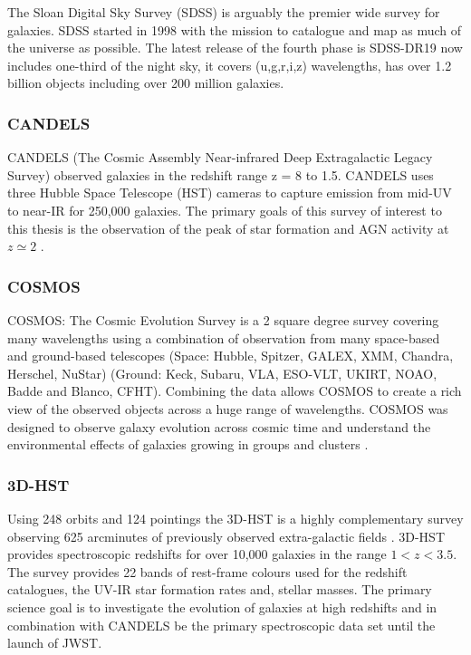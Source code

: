 The Sloan Digital Sky Survey (SDSS) is arguably the premier wide survey for galaxies. SDSS started in 1998 with the mission to catalogue and map as much of the universe as possible. The latest release of the fourth phase is SDSS-DR19 \citep{Ahumada2019TheSpectra} now includes one-third of the night sky, it covers (u,g,r,i,z) wavelengths, has over 1.2 billion objects including over 200 million galaxies.

\subsubsection{CANDELS}
CANDELS (The Cosmic Assembly Near-infrared Deep Extragalactic Legacy Survey) observed galaxies in the redshift range z = 8 to 1.5. CANDELS uses three Hubble Space Telescope (HST) cameras to capture emission from mid-UV to near-IR for 250,000 galaxies. The primary goals of this survey of interest to this thesis is the observation of the peak of star formation and AGN activity at $z \simeq 2$ \cite{Grogin2011Candels:Survey}.

\subsubsection{COSMOS}

COSMOS: The Cosmic Evolution Survey is a 2 square degree survey covering many wavelengths using a combination of observation from many space-based and ground-based telescopes (Space: Hubble, Spitzer, GALEX, XMM, Chandra, Herschel, NuStar) (Ground: Keck, Subaru, VLA, ESO-VLT, UKIRT, NOAO, Badde and Blanco, CFHT). Combining the data allows COSMOS to create a rich view of the observed objects across a huge range of wavelengths. COSMOS was designed to observe galaxy evolution across cosmic time and understand the environmental effects of galaxies growing in groups and clusters \citep{HomeCOSMOS}.

\subsubsection{3D-HST}

Using 248 orbits and 124 pointings the 3D-HST is a highly complementary survey observing 625 arcminutes of previously observed extra-galactic fields \citep{Brammer20123D-HST:Telescope}. 3D-HST provides spectroscopic redshifts for over 10,000 galaxies in the range $1 < z < 3.5$. The survey provides 22 bands of rest-frame colours used for the redshift catalogues, the UV-IR star formation rates and, stellar masses. The primary science goal is to investigate the evolution of galaxies at high redshifts and in combination with CANDELS be the primary spectroscopic data set until the launch of JWST.

